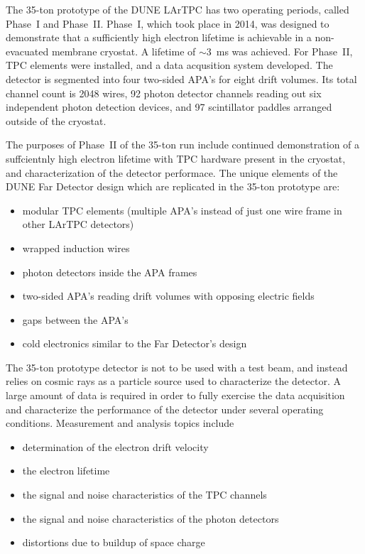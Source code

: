 \label{sec:35t}

The 35-ton prototype of the DUNE LArTPC has two operating periods, called Phase~I and Phase~II.  Phase~I, which took place
in 2014, was designed to demonstrate that a sufficiently high electron lifetime is achievable in a non-evacuated
membrane cryostat. A lifetime of $\sim$3~ms was achieved.  For Phase~II, TPC elements were installed, and
a data acqusition system developed.  The detector is segmented into four two-sided APA's for eight drift volumes.
Its total channel count is 2048 wires, 92 photon detector channels reading out six independent photon
detection devices, and 97 scintillator paddles arranged outside of the cryostat.

The purposes of Phase~II of the 35-ton run include continued demonstration of a suffcientnly high electron
lifetime with TPC hardware present in the cryostat, and characterization of the detector performace.
The unique elements of the DUNE Far Detector design which are replicated in the 35-ton
prototype are:
\begin{itemize}
\item  modular TPC elements (multiple APA's instead of just one wire frame in other LArTPC 
detectors)
\item wrapped induction wires
\item photon detectors inside the APA frames
\item two-sided APA's reading drift volumes with opposing electric fields
\item gaps between the APA's
\item cold electronics similar to the Far Detector's design
\end{itemize}

The 35-ton prototype detector is not to be used with a test beam, and instead relies on cosmic rays as
a particle source used to characterize the detector.  A large amount
of data is required in order to fully exercise the data acquisition and characterize the 
performance of the detector under several operating conditions.  Measurement and analysis topics include
\begin{itemize}
\item  determination of the electron drift velocity
\item the electron lifetime
\item the signal and noise characteristics of the TPC channels
\item the signal and noise characteristics of the photon detectors
\item distortions due to buildup of space charge
\end{itemize}

